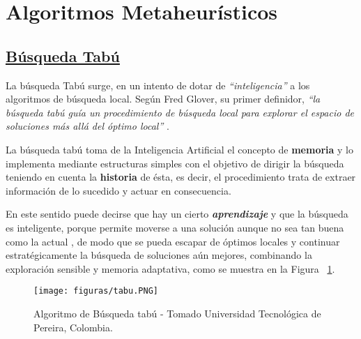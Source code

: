 \documentclass[10pt,conference]{IEEEtran}
\begin{document}
\section{\textbf{Algoritmos Metaheurísticos}} 

\subsection{\underline{\textbf{Búsqueda Tabú}}}
La búsqueda Tabú surge, en un intento de dotar de \textit{“inteligencia”} a los algoritmos de búsqueda local. Según Fred Glover, su primer definidor, \textit{“la búsqueda tabú guía un procedimiento de búsqueda local para explorar el espacio de soluciones más allá del óptimo local”} \citep{rioja}.

La búsqueda tabú toma de la Inteligencia Artificial el concepto de \textbf{memoria} y lo implementa mediante estructuras simples con el objetivo de dirigir la búsqueda teniendo en cuenta la \textbf{historia} de ésta, es decir, el procedimiento trata de extraer información de lo sucedido y actuar en consecuencia.

En este sentido puede decirse que hay un cierto \textbf{\textit{aprendizaje}} y que la búsqueda es inteligente, porque permite moverse a una solución aunque no sea tan buena como la actual \citep{Hassan}, de modo que se pueda escapar de óptimos locales y continuar estratégicamente la búsqueda de soluciones aún mejores, combinando la exploración sensible y memoria adaptativa, como se muestra en la Figura  ~\ref{tabu}.

\begin{figure}[H]
\begin{center}
\texttt{[image: figuras/tabu.PNG]}
\caption{Algoritmo de Búsqueda tabú - Tomado Universidad Tecnológica de Pereira, Colombia.}
\label{tabu} 
\end{center}
\end{figure}
\end{document}
